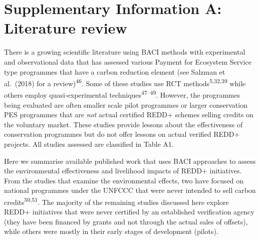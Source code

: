 \documentclass[
]{article}
\begin{document}
\setcounter{table}{0} \renewcommand{\thetable}{A\arabic{table}} \setcounter{figure}{0} \renewcommand{\thefigure}{A\arabic{figure}} 
\clearpage

\setcounter{table}{0}  
\renewcommand{\thetable}{A\arabic{table}}
\setcounter{figure}{0} 
\renewcommand{\thefigure}{A\arabic{figure}}

\clearpage

\hypertarget{supplementary-information-a-literature-review}{%
\section*{Supplementary Information A: Literature
review}\label{supplementary-information-a-literature-review}}

There is a growing scientific literature using BACI methods with
experimental and observational data that has assessed various Payment
for Ecosystem Service type programmes that have a carbon reduction
element (see Salzman et al.~(2018) for a review)\textsuperscript{46}.
Some of these studies use RCT methods\textsuperscript{5,32,39} while
others employ quasi-experimental techniques\textsuperscript{47--49}.
However, the programmes being evaluated are often smaller scale pilot
programmes or larger conservation PES programmes that are \emph{not}
actual certified REDD+ schemes selling credits on the voluntary market.
These studies provide lessons about the effectiveness of conservation
programmes but do not offer lessons on actual verified REDD+ projects.
All studies assessed are classified in Table A1.

Here we summarise available published work that uses BACI approaches to
assess the environmental effectiveness and livelihood impacts of REDD+
initiatives. From the studies that examine the environmental effects,
two have focused on national programmes under the UNFCCC that were never
intended to sell carbon credits\textsuperscript{50,51}. The majority of
the remaining studies discussed here explore REDD+ initiatives that were
never certified by an established verification agency (they have been
financed by grants and not through the actual sales of offsets), while
others were mostly in their early stages of development (pilots).
\end{document}
